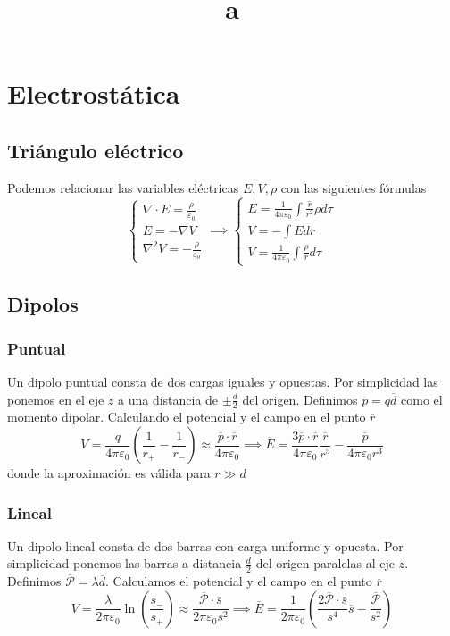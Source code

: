 \documentclass[leqno]{article}
\title{a}
\begin{document}
\maketitle
\tableofcontents
\newpage
\section{Electrostática}
\subsection{Triángulo eléctrico}
Podemos relacionar las variables eléctricas $ E, V, \rho$ con las siguientes fórmulas
\[
  \begin{cases}
\displaystyle\nabla\cdot E = \frac{\rho}{\varepsilon_0} \\ \displaystyle E = -\nabla V \\ \displaystyle \nabla ^2 V = -\frac{\rho}{\varepsilon_0}
  \end{cases}
  \implies
  \begin{cases}
    \displaystyle E = \frac{1}{4\pi \varepsilon_0} \int \frac{\hat{r}}{r^2}\rho d\tau \\
	\displaystyle V = -\int E dr \\
	\displaystyle V = \frac{1}{4\pi \varepsilon_0 } \int \frac{\rho}{r}d\tau 
  \end{cases}
\] 

\subsection{Dipolos}
\subsubsection{Puntual}
Un dipolo puntual consta de dos cargas iguales y opuestas. Por simplicidad las ponemos en el eje $z$ a una distancia de $\pm \frac{d}{2}$ del origen. Definimos $\boxed{\overline{p} = q\overline{d}}$ como el momento dipolar. Calculando el potencial y el campo en el punto $\overline{r}$
\[
V = \frac{q}{4\pi \varepsilon_0}(\frac{1}{r_+} - \frac{1}{r_-}) \approx \frac{\overline{p}\cdot \overline{r}}{4\pi \varepsilon _0}  \implies \overline{E} = \frac{3\overline{p}\cdot \overline{r}}{4\pi \varepsilon _0} \frac{\overline{r}}{r^5} - \frac{\overline{p}}{4\pi \varepsilon _0r^3}
\] 
donde la aproximación es válida para $r\gg d$
\subsubsection{Lineal}
Un dipolo lineal consta de dos barras con carga uniforme y opuesta. Por simplicidad ponemos las barras a distancia $\frac{d}{2}$ del origen paralelas al eje $z$. Definimos $\boxed{\overline{\mathcal{P}} = \lambda \overline{d}}$. Calculamos el potencial y el campo en el punto $\overline{r}$
\[
V = \frac{\lambda}{2\pi \varepsilon _0} \ln(\frac{s_-}{s_+}) \approx \frac{\overline{\mathcal{P}}\cdot \overline{s}}{2\pi\varepsilon _0s^2} \implies \overline{E} = \frac{1}{2\pi\varepsilon _0}\left( \frac{2\overline{\mathcal{P}}\cdot \overline{s}}{s^4}\overline{s} - \frac{\overline{\mathcal{P}}}{s^2} \right) 
\] 
\end{document}
